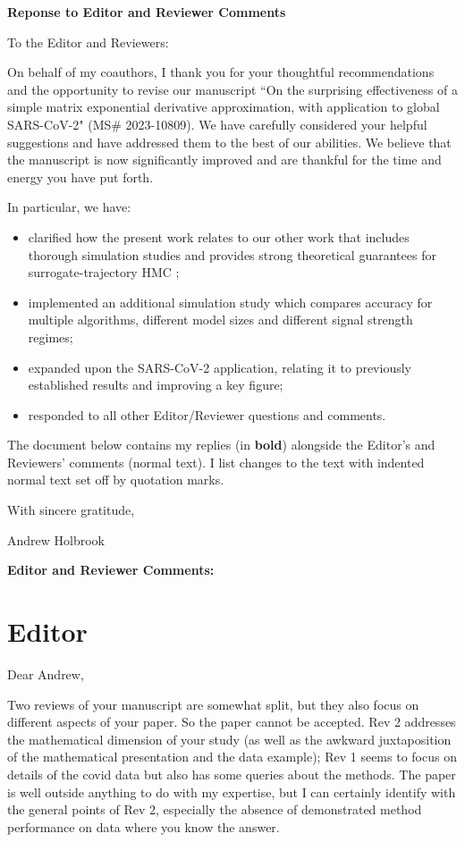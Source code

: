 \documentclass[12pt]{article}
\def\paperTitle{On the surprising effectiveness of a simple matrix exponential derivative approximation, with application to global SARS-CoV-2}
\def\paperID{MS\# 2023-10809}
\begin{document}


\centerline{\large \bf Reponse to Editor and Reviewer Comments}

To the Editor and Reviewers:

On behalf of my coauthors, I thank you for your thoughtful recommendations and the opportunity to revise our manuscript ``\paperTitle" (\paperID).
We have carefully considered your helpful suggestions and have addressed them to the best of our abilities.  We believe that the manuscript is now significantly improved and are thankful for the time and energy you have put forth.

In particular, we have:
\begin{itemize}
	\item clarified how the present work relates to our other work that includes thorough simulation studies \citet{magee2023random} and provides strong theoretical guarantees for surrogate-trajectory HMC \citet{glatt2020accept};
	
	\item implemented an additional simulation study which compares accuracy for multiple algorithms, different model sizes and different signal strength regimes;
    
    \item expanded upon the SARS-CoV-2 application, relating it to previously established results and improving a key figure;
	
	\item responded to all other Editor/Reviewer questions and comments.
\end{itemize}


The document below contains my replies (in \textbf{bold}) alongside the Editor's and Reviewers' comments (normal text).  I list changes to the text with indented normal text set off by quotation marks.

With sincere gratitude,

Andrew Holbrook
\clearpage


{\Large \bf Editor and Reviewer Comments:}


\section*{Editor}

Dear Andrew, 

Two reviews of your manuscript are somewhat split, but they also focus on different aspects of your paper. So the paper cannot be accepted. Rev 2 addresses the mathematical dimension of your study (as well as the awkward juxtaposition of the mathematical presentation and the data example); Rev 1 seems to focus on details of the covid data but also has some queries about the methods. The paper is well outside anything to do with my expertise, but I can certainly identify with the general points of Rev 2, especially the absence of demonstrated method performance on data where you know the answer. 
\end{document}
